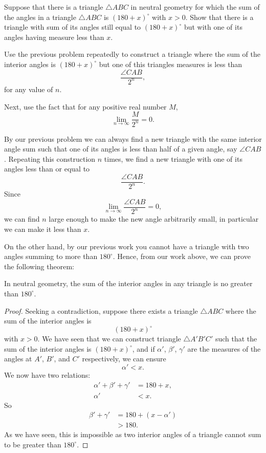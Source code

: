 \documentclass[noauthor,nooutcomes,12pt,hints]{ximera}
\begin{document}
\begin{problem}
\label{121} Suppose that there is a triangle $\triangle ABC$ in
neutral geometry for which the sum of the angles in a triangle $\triangle
ABC$ is $\left( 180+x\right)^\circ$ with $x>0$. Show that there is a
triangle with sum of its angles still equal to $\left(180+x\right)^\circ$
but with one of its angles having measure less than $x$. %


\begin{hint}
Use the previous problem repeatedly to construct a triangle where the sum of the
interior angles is $(180+x)^\circ$ but one of this triangles measures is less than
\[
\frac{\angle CAB}{2^n},
\]
for any value of $n$.
\end{hint}
\begin{hint}
Next, use the fact that for any positive real number $M$,
\[
\lim_{n\to \infty}\frac{M}{2^n} = 0.
\]
\end{hint}
\begin{freeResponse}
By our previous problem we can always find a new triangle with the
same interior angle sum such that one of its angles is less than half
of a given angle, say $\angle CAB$. Repeating this construction $n$
times, we find a new triangle with one of its angles less than or
equal to
\[
\frac{\angle CAB}{2^n}.
\]
Since 
\[
\lim_{n\to \infty}\frac{\angle CAB}{2^n} = 0,
\]
we can find $n$ large enough to make the new angle arbitrarily small, in
particular we can make it less than $x$.
\end{freeResponse}

\end{problem}


On the other hand, by our previous work
you cannot have a triangle with two angles summing to more than
$180^\circ$. Hence, from our work above, we can prove the following
theorem:

\begin{theorem}
In neutral geometry, the sum of the interior angles in any triangle is no greater
than $180^\circ$.
\end{theorem}

\begin{proof}
Seeking a contradiction, suppose there exists a triangle $\triangle
ABC$ where the sum of the interior angles is 
\[
\left(180+x\right)^\circ
\]
with $x>0$. We have seen that we can construct triangle $\triangle
A'B'C'$ such that the sum of the interior angles is $(180+x)^\circ$,
and if $\alpha'$, $\beta'$, $\gamma'$ are the measures of the angles
at $A'$, $B'$, and $C'$ respectively, we can ensure 
\[
\alpha' < x.
\]
We now have two relations:
\begin{align*}
\alpha' + \beta' + \gamma' &= 180 + x,\\
\alpha' &< x.
\end{align*}
So%
\begin{align*}
\beta'+\gamma'&=180+\left(x-\alpha'\right)\\
&>180.
\end{align*}
As we have seen, this is impossible as two interior angles of a
triangle cannot sum to be greater than $180^\circ$.
\end{proof}
\end{document}
